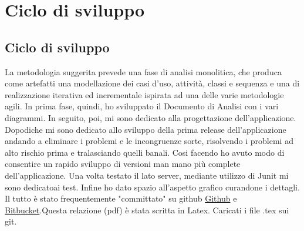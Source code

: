 	
	
\chapter{Ciclo di sviluppo}	
\section{Ciclo di sviluppo}	
La metodologia suggerita prevede una fase di analisi monolitica, che produca come artefatti una modellazione dei casi d'uso, attività, classi e sequenza e una di realizzazione iterativa ed incrementale ispirata ad una delle varie metodologie agili. In prima fase, quindi, ho sviluppato il Documento di Analisi con i vari diagrammi. In seguito, poi, mi sono dedicato alla progettazione dell'applicazione. Dopodiche mi sono dedicato allo sviluppo della prima release dell'applicazione andando a eliminare i problemi e le incongruenze sorte, risolvendo i problemi ad alto rischio prima e tralasciando quelli banali. Cosi facendo ho avuto modo di consentire un rapido sviluppo di versioni man mano più complete dell'applicazione. Una volta testato il lato server, mediante utilizzo di Junit mi sono dedicatoai test. Infine ho dato spazio all'aspetto grafico curandone i dettagli. Il tutto è stato frequentemente "committato" su github \href{https://github.com/jgemmy/Doodle}{Github} e \href{https://bitbucket.org/jgemmy/doodle}{Bitbucket}.Questa relazione (pdf) è stata scritta in Latex. Caricati i file .tex sui git.
